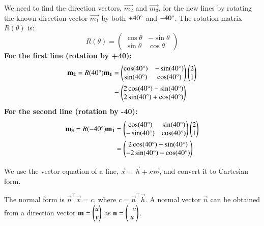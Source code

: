 \documentclass[journal]{IEEEtran}
\begin{document}
We need to find the direction vectors, $\vec{m_2}$ and $\vec{m_3}$, for the new lines by rotating the known direction vector $\vec{m_1}$ by both $+40\degree$ and $-40\degree$. The rotation matrix $R(\theta)$ is:
$$ R(\theta) = \begin{pmatrix} \cos\theta & -\sin\theta \\ \sin\theta & \cos\theta \end{pmatrix} $$
\textbf{For the first line (rotation by +40\degree):}
\begin{align*}
\mathbf{m_2} = R(40\degree) \mathbf{m_1} &= \begin{pmatrix} \cos(40\degree) & -\sin(40\degree) \\ \sin(40\degree) & \cos(40\degree) \end{pmatrix} \begin{pmatrix}2 \\ 1\end{pmatrix} \\
&= \begin{pmatrix}2\cos(40\degree) - \sin(40\degree) \\ 2\sin(40\degree) + \cos(40\degree)\end{pmatrix}
\end{align*}
\textbf{For the second line (rotation by -40\degree):}
\begin{align*}
\mathbf{m_3} = R(-40\degree) \mathbf{m_1} &= \begin{pmatrix} \cos(40\degree) & \sin(40\degree) \\ -\sin(40\degree) & \cos(40\degree) \end{pmatrix} \begin{pmatrix}2 \\ 1\end{pmatrix} \\
&= \begin{pmatrix}2\cos(40\degree) + \sin(40\degree) \\ -2\sin(40\degree) + \cos(40\degree)\end{pmatrix}
\end{align*}


We use the vector equation of a line, $\vec{x} = \vec{h} + \kappa \vec{m}$, and convert it to Cartesian form.






The normal form is $\vec{n}^\top \vec{x} = c$, where $c = \vec{n}^\top \vec{h}$. A normal vector $\vec{n}$ can be obtained from a direction vector $\mathbf{m} = \begin{pmatrix}u \\ v\end{pmatrix}$ as $\mathbf{n} = \begin{pmatrix}-v \\ u\end{pmatrix}$.\\
\end{document}
